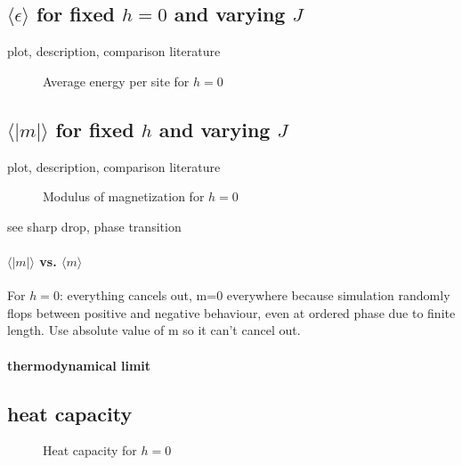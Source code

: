 \documentclass{scrartcl}
\begin{document}
\subsection{$\langle \epsilon\rangle$ for fixed $h=0$ and varying $J$}
plot, description, comparison literature
	\begin{figure}[htbp]
		
		\caption{Average energy per site for $h=0$}
		\label{fig:energy}
	\end{figure}

\subsection{$\langle |m|\rangle$ for fixed $h$ and varying $J$}
plot, description, comparison literature

	\begin{figure}[htbp]
		
		\caption{Modulus of magnetization for $h=0$}
		\label{fig:absmag}
	\end{figure}
see sharp drop, phase transition
\paragraph{$\langle |m|\rangle$ vs. $\langle m\rangle$}
For $h=0$: everything cancels out, m=0 everywhere because simulation randomly flops between positive and negative behaviour, even at ordered phase due to finite length.
Use absolute value of m so it can't cancel out.

\paragraph{thermodynamical limit}

\subsection{heat capacity}

	\begin{figure}[htbp]
		
		\caption{Heat capacity for $h=0$}
		\label{fig:heat}
	\end{figure}

\newpage	
\listoffigures
\printbibliography
\end{document}
